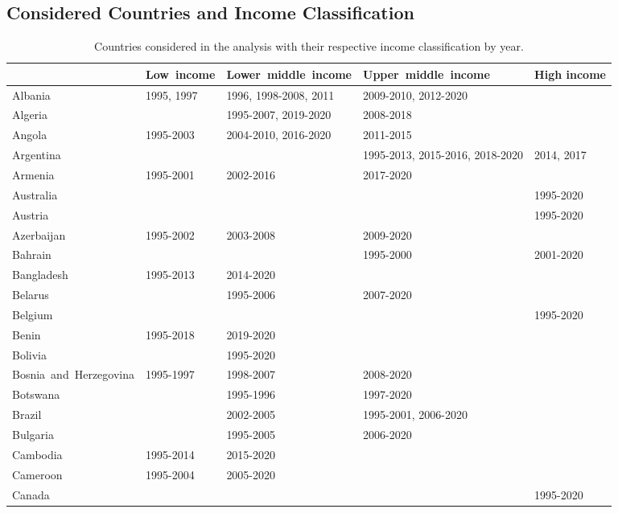 \begin{appendices}
\section{Considered Countries and Income Classification}
\label{annex:countries-income}

\begin{table}[H]
	\centering
	\caption{Countries considered in the analysis with their respective income classification by year.}
    \fontsize{4}{3}\selectfont %
    \begin{adjustbox}{width=\textwidth,center}
	\begin{tabular}{|l|llll|}
	\toprule
	 & Low\ income & Lower\ middle\ income & Upper\ middle\ income & High income \\
	\midrule
	Albania & 1995, 1997 & 1996, 1998-2008, 2011 & 2009-2010, 2012-2020 &  \\
	Algeria &  & 1995-2007, 2019-2020 & 2008-2018 &  \\
	Angola & 1995-2003 & 2004-2010, 2016-2020 & 2011-2015 &  \\
	Argentina &  &  & 1995-2013, 2015-2016, 2018-2020 & 2014, 2017 \\
	Armenia & 1995-2001 & 2002-2016 & 2017-2020 &  \\
	Australia &  &  &  & 1995-2020 \\
	Austria &  &  &  & 1995-2020 \\
	Azerbaijan & 1995-2002 & 2003-2008 & 2009-2020 &  \\
	Bahrain &  &  & 1995-2000 & 2001-2020 \\
	Bangladesh & 1995-2013 & 2014-2020 &  &  \\
	Belarus &  & 1995-2006 & 2007-2020 &  \\
	Belgium &  &  &  & 1995-2020 \\
	Benin & 1995-2018 & 2019-2020 &  &  \\
	Bolivia &  & 1995-2020 &  &  \\
	Bosnia\ and\ Herzegovina & 1995-1997 & 1998-2007 & 2008-2020 &  \\
	Botswana &  & 1995-1996 & 1997-2020 &  \\
	Brazil &  & 2002-2005 & 1995-2001, 2006-2020 &  \\
	Bulgaria &  & 1995-2005 & 2006-2020 &  \\
	Cambodia & 1995-2014 & 2015-2020 &  &  \\
	Cameroon & 1995-2004 & 2005-2020 &  &  \\
	Canada &  &  &  & 1995-2020 \\

\end{tabular}
\end{adjustbox}
\end{table}
\end{appendices}
